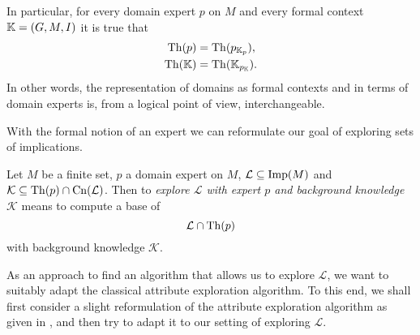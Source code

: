 In particular, for every domain expert $p$ on $M$ and every formal context ${\mathbb{K}} = (G,
M, I)$ it is true that
\begin{align*}
  \operatorname{Th}(p) &= \operatorname{Th}(p_{{\mathbb{K}}_p}), \\
  \operatorname{Th}({\mathbb{K}}) &= \operatorname{Th}({\mathbb{K}}_{p_{{\mathbb{K}}}}).
\end{align*}
In other words, the representation of domains as formal contexts and in terms of domain
experts is, from a logical point of view, interchangeable.

With the formal notion of an expert we can reformulate our goal of exploring sets of
implications.

\begin{Definition}
  \label{def:exploring-sets-of-implications}
  Let $M$ be a finite set, $p$ a domain expert on $M$, $\mathcal{L} \subseteq \operatorname{Imp}(M)$ and
  $\mathcal{K} \subseteq \operatorname{Th}(p) \cap \operatorname{Cn}(\mathcal{L})$.  Then to \emph{explore
    $\mathcal{L}$ with expert $p$ and background knowledge $\mathcal{K}$} means to compute
  a base of
  \begin{equation*}
    \mathcal{L} \cap \operatorname{Th}(p)
  \end{equation*}
  with background knowledge $\mathcal{K}$.
\end{Definition}

As an approach to find an algorithm that allows us to explore $\mathcal{L}$, we want to
suitably adapt the classical attribute exploration algorithm.  To this end, we shall first
consider a slight reformulation of the attribute exploration algorithm as given in
, and then try to adapt it to our setting of exploring
$\mathcal{L}$.


